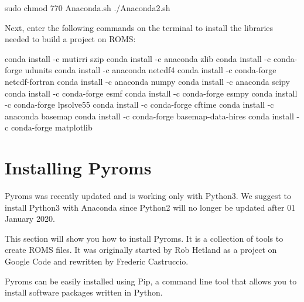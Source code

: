 \begin{bashcode}
 sudo chmod 770 Anaconda.sh
 ./Anaconda2.sh
\end{bashcode}
\bigskip

\noindent Next, enter the following commands on the terminal to install the libraries needed to build a project on ROMS:
\bigskip

\begin{bashcode}
conda install -c mutirri szip
conda install -c anaconda zlib
conda install -c conda-forge udunits
conda install -c anaconda netcdf4
conda install -c conda-forge netcdf-fortran
conda install -c anaconda numpy
conda install -c anaconda scipy
conda install -c conda-forge esmf
conda install -c conda-forge esmpy 
conda install -c conda-forge lpsolve55 
conda install -c conda-forge cftime
conda install -c anaconda basemap 
conda install -c conda-forge basemap-data-hires 
conda install -c conda-forge matplotlib 
\end{bashcode}
\bigskip

\section{Installing Pyroms}
\bigskip

\begin{tcolorbox}[enhanced,
    grow to left by   = 0cm,
    grow to right by  = 0cm,
    enlarge top by    = 0cm,
    enlarge bottom by = 0cm,
    tcbox raise base,
    boxrule           = 1.0pt,
    left              = 18mm,
    colframe          = red!50!black,coltext=red!25!black,colback=red!10!white,
    overlay           = {\begin{tcbclipinterior}\fill[red!75!blue!50!white] (frame.south west)
      rectangle node[text=white,font=\sffamily\bfseries\footnotesize,rotate=0] {WARNING} ([xshift=18mm]frame.north west);\end{tcbclipinterior}}]
Pyroms was recently updated and is working only with Python3. We suggest to install Python3 with Anaconda since Python2 will no longer be updated after 01 January 2020.
  \end{tcolorbox}
\bigskip

\noindent This section will show you how to install Pyroms. It is a collection of tools to create ROMS files. It was originally started by Rob Hetland as a
project on Google Code and rewritten by Frederic Castruccio.
\bigskip

\noindent Pyroms can be easily installed using Pip, a command line tool that allows you to install software packages written in Python.
\bigskip

